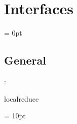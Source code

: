 
\section{Interfaces} 


\parskip = 0pt

\vspace{3mm} \subsection*{General}

: 

localreduce
\vspace{2mm}

\vspace{5mm}\parskip = 10pt 
